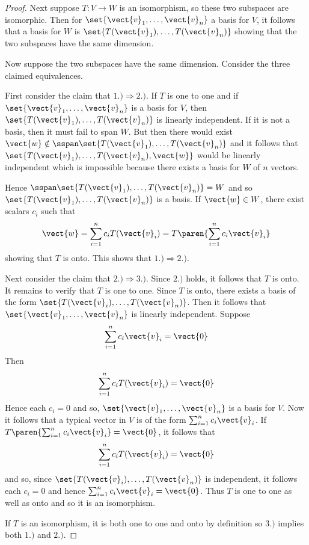 \begin{proof}
Next suppose $T:V \to W$ is an isomorphism, so these two subspaces are isomorphic. Then for $\set{\vect{v}_{1},\ldots,\vect{v}_{n}} $ a
basis for $V$, it follows that a basis for $W$
is $\set{T(\vect{v}_{1}),\ldots,T(\vect{v}_{n})} $ showing that the two
subspaces have the same dimension.

Now suppose the two subspaces have the same dimension. Consider the three
claimed equivalences.

First consider the claim that $1.)\Rightarrow 2.)$. If $T$ is one to one and if $\set{\vect{v}_{1},\ldots,\vect{v}
_{n}} $ is a basis for $V$, then $\set{T(\vect{v}_{1}),\ldots,T(\vect{v
}_{n})} $ is linearly independent. If it is not a basis, then it must
fail to span $W$. But then there would exist $\vect{w}\notin \sspan
\set{T(\vect{v}_{1}),\ldots,T(\vect{v}_{n})} $ and it follows that $\set{T(\vect{v}_{1}),\ldots,T(\vect{v}_{n}),\vect{w}
} $ would be linearly independent which is impossible because there exists a basis for $W$ of $n$ vectors.

Hence $\sspan\set{T(\vect{v}_{1}),\ldots,T(\vect{v}_{n})} =W$ and
so $\set{T(\vect{v}_{1}),\ldots,T(\vect{v}_{n})} $ is a basis. If $\vect{w}\in W$, there exist scalars $c_{i}$ such that
\begin{equation*}
\vect{w}=\sum_{i=1}^{n}c_{i}T(\vect{v}_{i})=T\paren{\sum_{i=1}^{n}c_{i}\vect{v}
_{i}}
\end{equation*}
showing that $T$ is onto. This shows that $1.)\Rightarrow 2.)$.

Next consider the claim that $2.)\Rightarrow 3.)$. Since $2.)$ holds, it
follows that $T$ is onto. It remains to verify that $T$ is one to one. Since
$T$ is onto, there exists a basis of the form $\set{T(\vect{v}_{i}),\ldots,T(\vect{v}_{n})}$. Then it follows that $\set{\vect{v}_{1},\ldots,
\vect{v}_{n}} $ is linearly independent. Suppose
\begin{equation*}
\sum_{i=1}^{n}c_{i}\vect{v}_{i}=\vect{0}
\end{equation*}
Then
\begin{equation*}
\sum_{i=1}^{n}c_{i}T(\vect{v}_{i})=\vect{0}
\end{equation*}
Hence each $c_{i}=0$ and so, $\set{\vect{v}_{1},\ldots,\vect{v}
_{n}} $ is a basis for $V$. Now it follows that a typical vector in $
V $ is of the form $\sum_{i=1}^{n}c_{i}\vect{v}_{i}$. If $T\paren{
\sum_{i=1}^{n}c_{i}\vect{v}_{i}} =\vect{0}$, it follows that
\begin{equation*}
\sum_{i=1}^{n}c_{i}T(\vect{v}_{i})=\vect{0}
\end{equation*}
and so, since $\set{T(\vect{v}_{i}),\ldots,T(\vect{v}_{n})} $ is
independent, it follows each $c_{i}=0$ and hence $\sum_{i=1}^{n}c_{i}\vect{v}
_{i}=\vect{0}$. Thus $T$ is one to one as well as onto and so it is an
isomorphism.

If $T$ is an isomorphism, it is both one to one and onto by definition so $
3.)$ implies both $1.)$ and $2.)$.
\end{proof}

